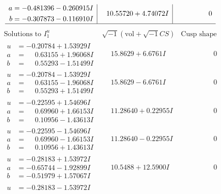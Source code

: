 \documentclass[1p]{elsarticle_modified}
\theoremstyle{definition}
\newcommand{\I}{\sqrt{-1}}
\begin{document}
$$\begin{array}{c|c|c}
\begin{aligned}
a &= -0.481396 - 0.260915 I \\
b &= -0.307873 - 0.116910 I\end{aligned}
 & \phantom{-}10.55720 + 4.74072 I & \phantom{-0.000000 } 0\\
 \hline 
 \end{array}$$\newpage$$\begin{array}{c|c|c}  
\text{Solutions to }I^u_{1}& \I (\text{vol} + \sqrt{-1}CS) & \text{Cusp shape}\\
 \hline 
\begin{aligned}
u &= -0.20784 + 1.53929 I \\
a &= \phantom{-}0.63155 + 1.96068 I \\
b &= \phantom{-}0.55293 - 1.51499 I\end{aligned}
 & \phantom{-}15.8629 + 6.6761 I & \phantom{-0.000000 } 0 \\ \hline\begin{aligned}
u &= -0.20784 - 1.53929 I \\
a &= \phantom{-}0.63155 - 1.96068 I \\
b &= \phantom{-}0.55293 + 1.51499 I\end{aligned}
 & \phantom{-}15.8629 - 6.6761 I & \phantom{-0.000000 } 0 \\ \hline\begin{aligned}
u &= -0.22595 + 1.54696 I \\
a &= \phantom{-}0.69960 + 1.66153 I \\
b &= \phantom{-}0.10956 - 1.43613 I\end{aligned}
 & \phantom{-}11.28640 + 0.22955 I & \phantom{-0.000000 } 0 \\ \hline\begin{aligned}
u &= -0.22595 - 1.54696 I \\
a &= \phantom{-}0.69960 - 1.66153 I \\
b &= \phantom{-}0.10956 + 1.43613 I\end{aligned}
 & \phantom{-}11.28640 - 0.22955 I & \phantom{-0.000000 } 0 \\ \hline\begin{aligned}
u &= -0.28183 + 1.53972 I \\
a &= -0.65744 - 1.92899 I \\
b &= -0.51979 + 1.57067 I\end{aligned}
 & \phantom{-}10.5488 + 12.5900 I & \phantom{-0.000000 } 0 \\ \hline\begin{aligned}
u &= -0.28183 - 1.53972 I \\

\end{aligned}
\end{array}$$
\end{document}
